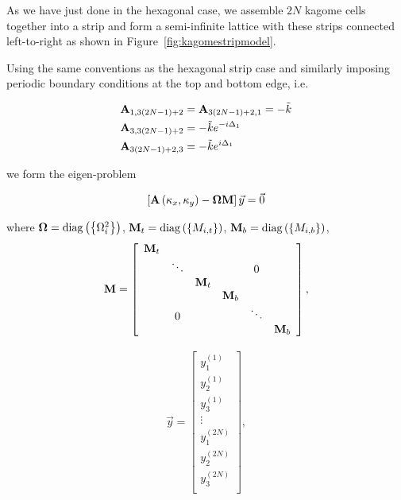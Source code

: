 As we have just done in the hexagonal case, we assemble $2N$ kagome cells
together into a strip and form a semi-infinite lattice with these strips
connected left-to-right as shown in Figure~\ref{fig:kagomestripmodel}.

Using the same conventions as the hexagonal strip case and similarly imposing
periodic boundary conditions at the top and bottom edge, i.e.

\begin{align}
  \mathbf{A}_{1,3(2N-1)+2}&=\mathbf{A}_{3(2N-1)+2,1}=-\tilde{k} \\
  \mathbf{A}_{3,3(2N-1)+2}&=-\tilde{k}e^{-i\Delta_1} \\
  \mathbf{A}_{3(2N-1)+2,3}&=-\tilde{k}e^{i\Delta_1} 
\end{align} 

we form the eigen-problem 

\begin{align}
  \left[\mathbf{A}\left(\kappa_{x},\kappa_{y}\right)-\mathbf{\Omega}\mathbf{M}\right]\vec{y}=\vec{0}
\label{eq:kagomestripeig}
\end{align}

where $\mathbf{\Omega}=\operatorname{diag}\left(\left\{\Omega_i^2\right\}\right)$,
$\mathbf{M}_{t}=\operatorname{diag}\left(\left\{M_{i,t}\right\}\right)$,
$\mathbf{M}_{b}=\operatorname{diag}\left(\left\{M_{i,b}\right\}\right)$,
\begin{align}
\mathbf{M}=\left[
\begin{array}{cccccc}
\mathbf{M}_{t}\\
 & \ddots &  &  & 0\\
 &  & \mathbf{M}_{t}\\
 &  &  & \mathbf{M}_{b}\\
 & 0 &  &  & \ddots\\
 &  &  &  &  & \mathbf{M}_{b}
\end{array}\right],
\end{align}

\begin{align}
\vec{y}=\left[
\begin{array}{c}
y_1^{(1)}\\
y_2^{(1)}\\
y_3^{(1)}\\
\vdots\\
y_1^{(2N)}\\
y_2^{(2N)}\\
y_3^{(2N)}\\
\end{array}\right],
\end{align}

